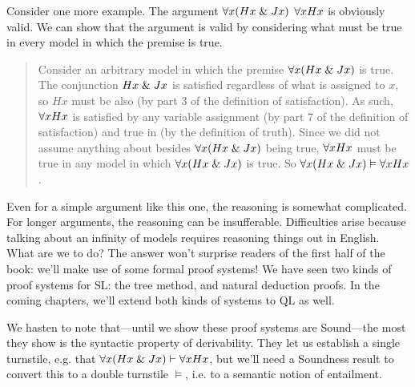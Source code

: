 Consider one more example. The argument $\forall x(Hx \mathrel\& Jx)$ \therefore   $\forall x Hx$ is obviously valid. We can show that the argument is valid by considering what must be true in every model in which the premise is true.
\begin{quote}
Consider an arbitrary model  in which the premise $\forall x(Hx \mathrel\& Jx)$ is true. The conjunction $Hx \mathrel\& Jx$ is satisfied regardless of what is assigned to $x$, so $Hx$ must be also (by part 3 of the definition of {satisfaction}). As such, $\forall x Hx$ is satisfied by any variable assignment (by part 7 of the definition of {satisfaction}) and true in  (by the definition of {truth}).
Since we did not assume anything about  besides $\forall x(Hx \mathrel\& Jx)$ being true, $\forall x Hx$ must be true in any model in which $\forall x(Hx \mathrel\& Jx)$ is true. So $\forall x(Hx \mathrel\& Jx) \vDash \forall x Hx$.
\end{quote}
Even for a simple argument like this one, the reasoning is somewhat complicated. For longer arguments, the reasoning can be insufferable. Difficulties arise because talking about an infinity of models requires reasoning things out in English. What are we to do? The answer won't surprise readers of the first half of the book: we'll make use of some formal proof systems! We have seen two kinds of proof systems for SL: the tree method, and natural deduction proofs. In the coming chapters, we'll extend both kinds of systems to QL as well. 

{\color{black}We hasten to note that---until we show these proof systems are Sound---the most they show is the syntactic property of derivability. They let us establish a single turnstile, e.g. that $\forall x(Hx \mathrel\& Jx) \vdash{} \forall x Hx$, but we'll need a Soundness result to convert this to a double turnstile $\models$, i.e. to a semantic notion of entailment.} 


\iffalse

\practiceproblems

